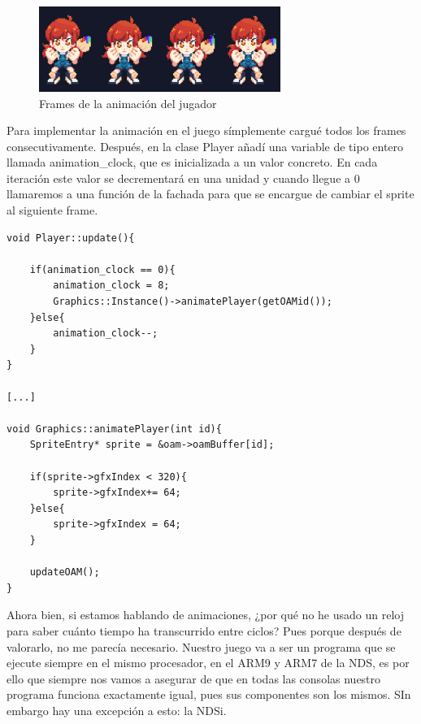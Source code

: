    \vspace{0.5cm}
  
\begin{figure}[htbp]
\centering
  \includegraphics[width=0.7\textwidth]{archivos/player_animation.png}
  \caption{Frames de la animación del jugador}
  \label{fig:player_animation}
\end{figure}

\clearpage
  
  Para implementar la animación en el juego símplemente cargué todos los frames consecutivamente. Después, en la clase Player añadí una variable de tipo entero llamada animation\_clock, que es inicializada a un valor concreto. En cada iteración este valor se decrementará en una unidad y cuando llegue a 0 llamaremos a una función de la fachada para que se encargue de cambiar el sprite al siguiente frame.
  
   \vspace{0.5cm}
  
   \begin{lstlisting}[caption={Animación del sprite del jugador}, label={code:animacionplayer}]
void Player::update(){

	if(animation_clock == 0){
		animation_clock = 8;
		Graphics::Instance()->animatePlayer(getOAMid());
	}else{
		animation_clock--;
	}
}

[...]

void Graphics::animatePlayer(int id){
    SpriteEntry* sprite = &oam->oamBuffer[id];

    if(sprite->gfxIndex < 320){
        sprite->gfxIndex+= 64;
    }else{
        sprite->gfxIndex = 64;
    }

    updateOAM();
}
\end{lstlisting}

   \vspace{0.5cm}
  
Ahora bien, si estamos hablando de animaciones, ¿por qué no he usado un reloj para saber cuánto tiempo ha transcurrido entre ciclos? Pues porque después de valorarlo, no me parecía necesario. Nuestro juego va a ser un programa que se ejecute siempre en el mismo procesador, en el ARM9 y ARM7 de la NDS, es por ello que siempre nos vamos a asegurar de que en todas las consolas nuestro programa funciona exactamente igual, pues sus componentes son los mismos. SIn embargo hay una excepción a esto: la NDSi.

